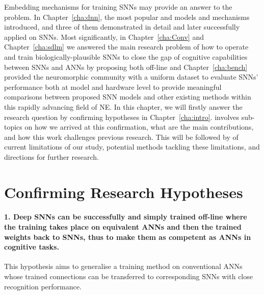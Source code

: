 Embedding \protect{} \protect{} mechanisms for training SNNs may provide an answer to the problem.
In Chapter~\ref{cha:dnn}, the most popular and \protect{} \protect{} models and mechanisms \protect{} \protect{} introduced, and three of them \protect{} \protect{} demonstrated in detail and later successfully applied on SNNs.
Most significantly, in Chapter~\ref{cha:Conv} and Chapter~\ref{cha:sdlm} we answered the main research problem of how to operate and train biologically-plausible SNNs to close the gap of cognitive capabilities between SNNs and ANNs by proposing \protect{} both off-line and \protect{} \protect{}
Chapter~\ref{cha:bench} \protect{} provided the neuromorphic community with a uniform dataset to evaluate SNNs' performance both at model and hardware level to provide meaningful comparisons between \protect{} \protect{} proposed SNN models and other existing methods within this rapidly advancing field of NE.
In this chapter, we will firstly answer the research question by confirming \protect{} \protect{} hypotheses \protect{} \protect{} in Chapter~\ref{cha:intro}.
\protect{}
\protect{} involves \protect{} sub-topics on how we arrived at this confirmation, what are the main contributions, and how this work challenges previous research.
This will be followed by \protect{} \protect{} of \protect{} current limitations of our study, \protect{} potential methods \protect{} \protect{} tackling these limitations, and directions for further research.



\section{Confirming Research Hypotheses}
\paragraph[1. Deep SNNs can be successfully and simply trained off-line where the training takes place on equivalent ANNs and then  the trained weights transferred back to the SNNs, thus to make them as competent as the ANNs in cognitive tasks.]{1. Deep SNNs can be successfully and simply trained off-line where the training takes place on equivalent ANNs and then \protect{} the trained weights \protect{} back to \protect{} SNNs, thus to make them as competent as \protect{} ANNs in cognitive tasks.}
This hypothesis aims to generalise a training method on conventional ANNs whose trained connections can be transferred to corresponding SNNs with close recognition performance.

